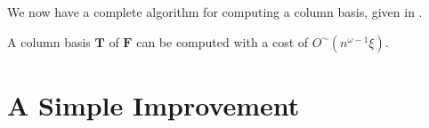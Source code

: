 We now have a complete algorithm for computing a column basis, given
in .


\begin{thm}
\label{thm:columnBasisCost1}A column basis $\mathbf{T}$ of $\mathbf{F}$
can be computed with a cost of $O^{\sim}\left(n^{\omega-1}\xi\right)$.
\end{thm}
\begin{comment}
This can be done by computing a left $\left[0,\dots,0,d,\dots,d\right]$-minimal
kernel basis $\left[\mathbf{T}',V\right]$ of $\left[\mathbf{G}^{T},\mathbf{F}^{T}\right]^{T}$,
where $d$ is the degree of $\mathbf{F},$ $V$ is a unimodular matrix
and $\mathbf{T}'$ is a $m\times m$ matrix. Note that $\left[\mathbf{T}',V\right]$
has $m$ rows since the rank of $\left[\mathbf{G}^{T},\mathbf{F}^{T}\right]^{T}$
is $m$. Also note that since $\left[\mathbf{T},I\right]$ is a left
kernel basis with $\left[0,\dots,0,d,\dots,d\right]$-row degrees
bounded by $d$, the $\left[0,\dots,0,d,\dots,d\right]$-minimal kernel
basis $\left[\mathbf{T}',V\right]$ must also has its $\left[0,\dots,0,d,\dots,d\right]$-row
degrees bounded by $d$, hence the degree of $V$ must be 0. We can
then easily compute $\mathbf{T}=\mathbf{T}'V^{-1}$. 
\end{comment}



\section{\label{sec:successiveColBasisComputation}A Simple Improvement}

